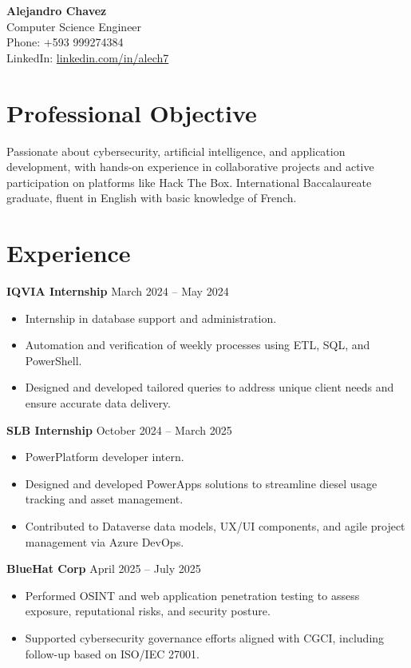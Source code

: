 \documentclass[11pt,a4paper]{article}
\newenvironment{uniformindent}{%
  \begin{list}{}{%
    \setlength{\leftmargin}{2em}
    \setlength{\rightmargin}{0pt}
    \setlength{\topsep}{0pt}
    \setlength{\partopsep}{0pt}
    \setlength{\parsep}{0pt}
    \setlength{\itemsep}{0pt}
  }
  \item[]
}{%
  \end{list}
}
\begin{document}
\begin{center}
    {\LARGE \textbf{Alejandro Chavez}} \\[0.2cm]
    Computer Science Engineer \\[0.1cm]
    Phone: +593 999274384 \\[0.1cm]
    LinkedIn: \href{https://www.linkedin.com/in/alech7/}{linkedin.com/in/alech7}
\end{center}

\begin{uniformindent}

\section*{Professional Objective}
Passionate about cybersecurity, artificial intelligence, and application development, with hands-on experience in collaborative projects and active participation on platforms like Hack The Box. International Baccalaureate graduate, fluent in English with basic knowledge of French.

\section*{Experience}

\textbf{IQVIA Internship} \hfill March 2024 -- May 2024
\begin{itemize}
    \item Internship in database support and administration.
    \item Automation and verification of weekly processes using ETL, SQL, and PowerShell.
    \item Designed and developed tailored queries to address unique client needs and ensure accurate data delivery.
\end{itemize}

\textbf{SLB Internship} \hfill October 2024 -- March 2025
\begin{itemize}
    \item PowerPlatform developer intern.
    \item Designed and developed PowerApps solutions to streamline diesel usage tracking and asset management.
    \item Contributed to Dataverse data models, UX/UI components, and agile project management via Azure DevOps.
\end{itemize}

\textbf{BlueHat Corp} \hfill April 2025 -- July 2025
\begin{itemize}
    \item Performed OSINT and web application penetration testing to assess exposure, reputational risks, and security posture.
    \item Supported cybersecurity governance efforts aligned with CGCI, including follow-up based on ISO/IEC 27001.
\end{itemize}


\end{uniformindent}
\end{document}
